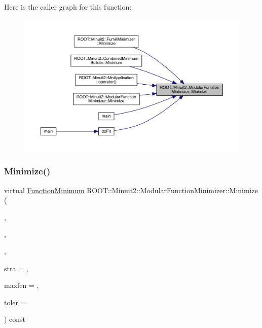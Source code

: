 Here is the caller graph for this function\+:
\nopagebreak
\begin{figure}[H]
\begin{center}
\leavevmode
\includegraphics[width=350pt]{d3/dc8/classROOT_1_1Minuit2_1_1ModularFunctionMinimizer_a8cbcb596782a34f43e4ce1c48865d0b7_icgraph}
\end{center}
\end{figure}
\mbox{\label{classROOT_1_1Minuit2_1_1ModularFunctionMinimizer_a0a881c0e1c53c2144c437cfb18f1971e}} 
\subsubsection{\texorpdfstring{Minimize()}{Minimize()}\hspace{0.1cm}{\footnotesize\ttfamily [2/33]}}
{\footnotesize\ttfamily virtual \mbox{\hyperlink{classROOT_1_1Minuit2_1_1FunctionMinimum}{Function\+Minimum}} R\+O\+O\+T\+::\+Minuit2\+::\+Modular\+Function\+Minimizer\+::\+Minimize (\begin{DoxyParamCaption}\item[{const \mbox{\hyperlink{classROOT_1_1Minuit2_1_1FCNBase}{F\+C\+N\+Base}} \&}]{,  }\item[{const std\+::vector$<$ double $>$ \&}]{,  }\item[{const std\+::vector$<$ double $>$ \&}]{,  }\item[{unsigned int}]{stra = {},  }\item[{unsigned int}]{maxfcn = {},  }\item[{double}]{toler = {} }\end{DoxyParamCaption}) const\hspace{0.3cm}{\ttfamily [virtual]}}



